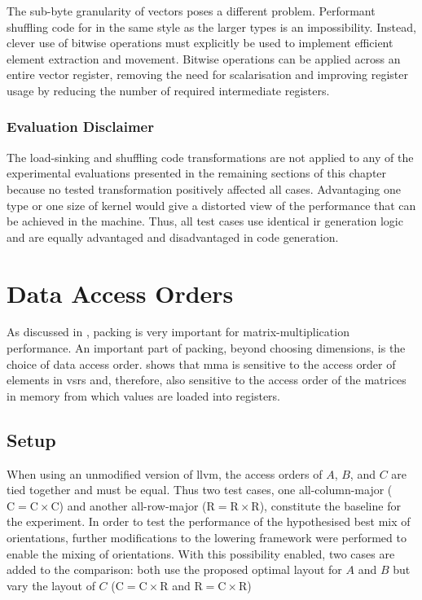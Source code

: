 \documentclass[\main/thesis.tex]{subfiles}
\begin{document}
The sub-byte granularity of  vectors poses a different problem.
Performant shuffling code for  in the same style as the larger types is an impossibility.
Instead, clever use of bitwise operations must explicitly be used to implement efficient element extraction and movement.
Bitwise operations can be applied across an entire vector register, removing the need for scalarisation and improving register usage by reducing the number of required intermediate registers.

\subsubsection{Evaluation Disclaimer}
The load-sinking and shuffling code transformations are not applied to any of the experimental evaluations presented in the remaining sections of this chapter because no tested transformation positively affected all cases.
Advantaging one type or one size of kernel would give a distorted view of the performance that can be achieved in the machine.
Thus, all test cases use identical \gls{ir} generation logic and are equally advantaged and disadvantaged in code generation.

\section{Data Access Orders}
\label{sec:variedOrders}
As discussed in , packing is very important for matrix-multiplication performance.
An important part of packing, beyond choosing dimensions, is the choice of data access order.
 shows that \gls{mma} is sensitive to the access order of elements in \glspl{vsr} and, therefore, also sensitive to the access order of the matrices in memory from which values are loaded into registers.

\subsection{Setup}
When using an unmodified version of \gls{llvm}, the access orders of $A$, $B$, and $C$ are tied together and must be equal.
Thus two test cases, one all-column-major ($\textrm{C} = \textrm{C} \times \textrm{C}$) and another all-row-major ($\textrm{R} = \textrm{R} \times \textrm{R}$), constitute the baseline for the experiment.
In order to test the performance of the hypothesised best mix of orientations, further modifications to the \gls{lowering} framework were performed to enable the mixing of orientations.
With this possibility enabled, two cases are added to the comparison: both use the proposed optimal layout for $A$ and $B$ but vary the layout of $C$ ($\textrm{C} = \textrm{C} \times \textrm{R}$ and $\textrm{R} = \textrm{C} \times \textrm{R}$)
\end{document}
